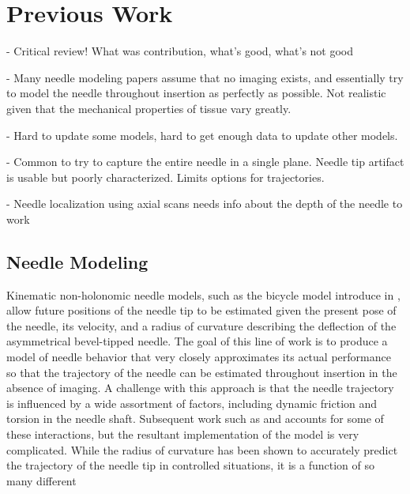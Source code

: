 %
%
%



\chapter{Previous Work}
\label{litreview} %


- Critical review! What was contribution, what's good, what's not good

- Many needle modeling papers assume that no imaging exists, and essentially try to model the needle throughout insertion as perfectly as possible. Not realistic given that the mechanical properties of tissue vary greatly.

- Hard to update some models, hard to get enough data to update other models.

- Common to try to capture the entire needle in a single plane. Needle tip artifact is usable but poorly characterized. Limits options for trajectories.

- Needle localization using axial scans needs info about the depth of the needle to work



\section{Needle Modeling}
Kinematic non-holonomic needle models, such as the bicycle model introduce in \cite{webster_nonholonomic_2006}, allow future positions of the needle tip to be estimated given the present pose of the needle, its velocity, and a radius of curvature describing the deflection of the asymmetrical bevel-tipped needle. The goal of this line of work is to produce a model of needle behavior that very closely approximates its actual performance so that the trajectory of the needle can be estimated throughout insertion in the absence of imaging. A challenge with this approach is that the needle trajectory is influenced by a wide assortment of factors, including dynamic friction and torsion in the needle shaft. Subsequent work such as \cite{reed*_modeling_2009} and \cite{swensen_torsional_2014} accounts for some of these interactions, but the resultant implementation of the model is very complicated. While the radius of curvature has been shown to accurately predict the trajectory of the needle tip in controlled situations, it is a function of so many different 

